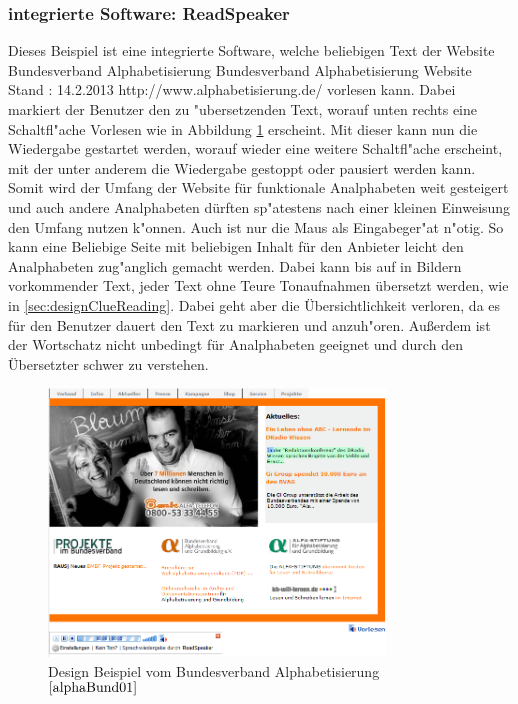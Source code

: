 \subsubsection{ integrierte Software: ReadSpeaker}

Dieses Beispiel ist eine integrierte Software, welche beliebigen Text der Website Bundesverband Alphabetisierung
						{Bundesverband Alphabetisierung Website}
						{Stand : 14.2.2013}
						{http://www.alphabetisierung.de/}
vorlesen kann.
Dabei markiert der Benutzer den zu "ubersetzenden Text, worauf unten rechts eine Schaltfl"ache \glqq Vorlesen \grqq wie in Abbildung  \ref{fig:DesignBeispiel1} erscheint. Mit dieser kann nun die Wiedergabe gestartet werden, worauf wieder eine weitere Schaltfl"ache erscheint, mit der unter anderem die Wiedergabe gestoppt oder pausiert werden kann.\\
Somit wird der Umfang der Website für funktionale Analphabeten weit gesteigert und auch andere Analphabeten dürften sp"atestens nach einer kleinen Einweisung den Umfang nutzen k"onnen. Auch ist nur die Maus als Eingabeger"at n"otig. So kann eine Beliebige Seite mit beliebigen Inhalt für den Anbieter leicht den Analphabeten zug"anglich gemacht werden. Dabei kann bis auf in Bildern vorkommender Text, jeder Text ohne Teure Tonaufnahmen übersetzt werden, wie in \ref{sec:designClueReading}. Dabei geht aber die Übersichtlichkeit verloren, da es für den Benutzer dauert den Text zu markieren und anzuh"oren. Außerdem ist der Wortschatz nicht unbedingt für Analphabeten geeignet und durch den Übersetzter schwer zu verstehen.
\begin{figure}[h]
	\centering
		\includegraphics[width=0.80\textwidth]{Daten/DesignBeispiel1.png}
	\caption{Design Beispiel vom Bundesverband Alphabetisierung $^{\ref{alphaBund01}}$}
	\label{fig:DesignBeispiel1}
\end{figure}

